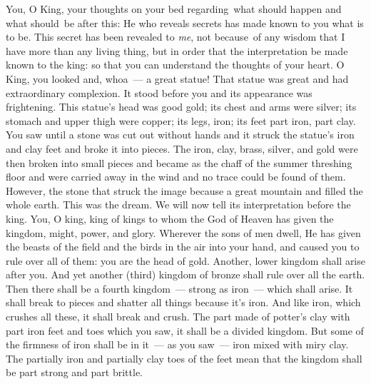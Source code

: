 \begin{inparaenum}
   You, O King, your thoughts on your bed regarding\understood{}\ what should happen and what should\understood{}\ be after this: He who reveals secrets has made known to you what is to be.%
   This secret has been revealed to \emph{me}, not because\understood{}\ of any wisdom that I have more than any living thing, but in order that the interpretation be made known to the king: so that you can understand the thoughts of your heart.%
   O King, you looked and, whoa~--- a great statue! That statue was great and had extraordinary complexion. It stood before you and its appearance was frightening.%
   This statue's head was good gold; its chest and arms were silver; its stomach and upper thigh were copper;%
   its legs, iron; its feet part iron, part clay.%
   You saw until a stone was cut out without hands and it struck the statue's iron and clay feet and broke it into pieces.%
   The iron, clay, brass, silver, and gold were then broken into small pieces and became as the chaff of the summer threshing floor and were carried away in the wind and no trace could be found of them. However, the stone that struck the image because a great mountain and filled the whole earth.%
   This was the dream. We will now tell its interpretation before the king.%
   You, O king, king of kings to whom the God of Heaven has given the kingdom, might, power, and glory.%
   Wherever the sons of men dwell, He has given the beasts of the field and the birds in the air into your hand, and caused you to rule over all of them: you are the head of gold.%
   Another, lower kingdom shall arise after you. And yet another (third) kingdom of bronze shall rule over all the earth.%
   Then there shall be a fourth kingdom~--- strong as iron~--- which shall arise. It shall break to pieces and shatter all things because it's iron. And like iron, which crushes all these, it shall break and crush.%
   The part made of potter's clay with part iron feet and toes which you saw, it shall be a divided kingdom. But some of the firmness of iron shall be in it~--- as you saw~--- iron mixed with miry clay.%
   The partially iron and partially clay toes of the feet mean that the kingdom shall be part strong and part brittle.%

\end{inparaenum}
